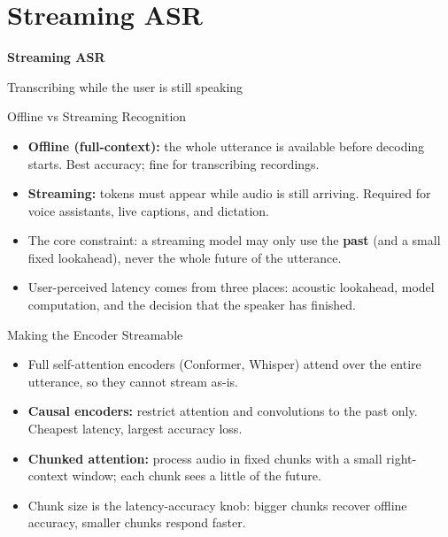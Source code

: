 \section{Streaming ASR}

\begin{frame}[plain]
  \centering
  \vspace{0.10\textheight}
  {\LARGE \textbf{Streaming ASR}}

  \vspace{0.08\textheight}
  {\large Transcribing while the user is still speaking}
\end{frame}

\begin{frame}{Offline vs Streaming Recognition}
  \begin{itemize}
    \item \textbf{Offline (full-context):} the whole utterance is available before decoding starts. Best accuracy; fine for transcribing recordings.
    \item \textbf{Streaming:} tokens must appear while audio is still arriving. Required for voice assistants, live captions, and dictation.
    \item The core constraint: a streaming model may only use the \textbf{past} (and a small fixed lookahead), never the whole future of the utterance.
    \item User-perceived latency comes from three places: acoustic lookahead, model computation, and the decision that the speaker has finished.
  \end{itemize}
\end{frame}

\begin{frame}{Making the Encoder Streamable}
  \begin{itemize}
    \item Full self-attention encoders (Conformer, Whisper) attend over the entire utterance, so they cannot stream as-is.
    \item \textbf{Causal encoders:} restrict attention and convolutions to the past only. Cheapest latency, largest accuracy loss.
    \item \textbf{Chunked attention:} process audio in fixed chunks with a small right-context window; each chunk sees a little of the future.
    \item Chunk size is the latency-accuracy knob: bigger chunks recover offline accuracy, smaller chunks respond faster.
  \end{itemize}
\end{frame}

